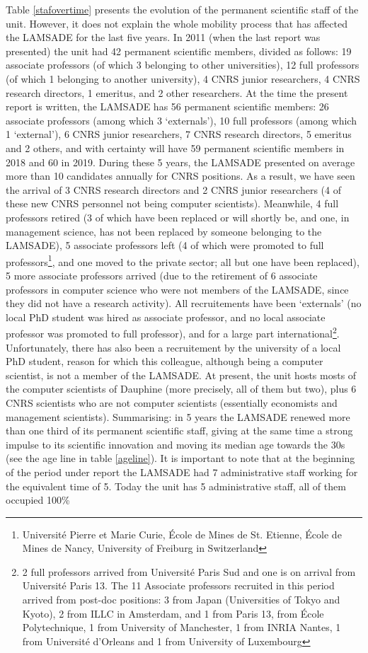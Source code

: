 Table \ref{stafovertime} presents the evolution of the permanent scientific staff of the unit. However, it does not explain the whole mobility process that has affected the LAMSADE for the last five years. In 2011 (when the last report was presented) the unit had 42 permanent scientific members, divided as follows: 19 associate professors (of which 3 belonging to other universities), 12 full professors (of which 1 belonging to another university), 4 CNRS junior researchers, 4 CNRS research directors, 1 emeritus, and 2 other researchers. At the time the present report is written, the LAMSADE has 56 permanent scientific members: 26 associate professors (among which 3 `externals'), 10 full professors (among which 1 `external'), 6 CNRS junior researchers, 7 CNRS research directors, 5 emeritus and 2 others, and with certainty will have 59 permanent scientific members in 2018 and 60 in 2019. During these 5 years, the LAMSADE presented on average more than 10 candidates annually for CNRS positions. As a result, we have seen the arrival of 3 CNRS research directors and 2 CNRS junior researchers (4 of these new CNRS personnel not being computer scientists). Meanwhile, 4 full professors retired (3 of which have been replaced or will shortly be, and one, in management science, has not been replaced by someone belonging to the LAMSADE), 5 associate professors left (4 of which were promoted to full professors\footnote{Université Pierre et Marie Curie, École de Mines de St. Etienne, École de Mines de Nancy, University of Freiburg in Switzerland}, and one moved to the private sector; all but one have been replaced), 5 more associate professors arrived (due to the retirement of 6 associate professors in computer science who were not members of the LAMSADE, since they did not have a research activity). All recruitements have been `externals' (no local PhD student was hired as associate professor, and no local associate professor was promoted to full professor), and for a large part international\footnote{2 full professors arrived from Université Paris Sud and one is on arrival from Université Paris 13. The 11 Associate professors recruited in this period arrived from post-doc positions: 3 from Japan (Universities of Tokyo and Kyoto), 2 from ILLC in Amsterdam, and 1 from Paris 13, from École Polytechnique, 1 from University of Manchester, 1 from INRIA Nantes, 1 from Université d'Orleans and 1 from University of Luxembourg}. Unfortunately, there has also been a recruitement by the university of a local PhD student, reason for which this colleague, although being a computer scientist, is not a member of the LAMSADE. At present, the unit hosts mosts of the computer scientists of Dauphine (more precisely, all of them but two), plus 6 CNRS scientists who are not computer scientists (essentially economists and management scientists). Summarising: in 5 years the LAMSADE renewed more than one third of its permanent scientific staff, giving at the same time a strong impulse to its scientific innovation and moving its median age towards the 30s (see the age line in table \ref{ageline}). It is important to note that at the beginning of the period under report the LAMSADE had 7 administrative staff working for the equivalent time of 5. Today the unit has 5 administrative staff, all of them occupied 100\% 